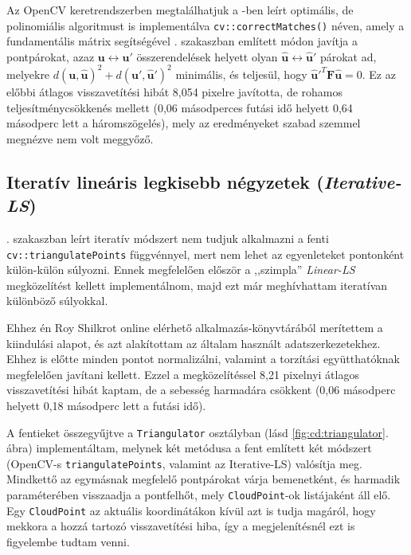 Az OpenCV keretrendszerben megtalálhatjuk a \cite{hartley-triangulation}-ben leírt optimális, de polinomiális algoritmust is implementálva \texttt{cv::correctMatches()} néven, amely a fundamentális mátrix segítségével . szakaszban említett módon javítja a pontpárokat, azaz $\mathbf{u} \leftrightarrow \mathbf{u}'$ összerendelések helyett olyan $\mathbf{\hat{u}} \leftrightarrow \mathbf{\hat{u}}'$ párokat ad, melyekre $d(\mathbf{u}, \mathbf{\hat{u}})^2 + d(\mathbf{u}', \mathbf{\hat{u}}')^2$ minimális, és teljesül, hogy $\mathbf{\hat{u}}'^T \mathbf{F} \mathbf{\hat{u}} = 0$. Ez az előbbi átlagos visszavetítési hibát 8,054 pixelre javította, de rohamos teljesítménycsökkenés mellett (0,06 másodperces futási idő helyett 0,64 másodperc lett a háromszögelés), mely az eredményeket szabad szemmel megnézve nem volt meggyőző.


\subsection{Iteratív lineáris legkisebb négyzetek (\textit{Iterative-LS})}

. szakaszban leírt iteratív módszert nem tudjuk alkalmazni a fenti \texttt{cv::triangulatePoints} függvénnyel, mert nem lehet az egyenleteket pontonként külön-külön súlyozni. Ennek megfelelően először a ,,szimpla'' \textit{Linear-LS} megközelítést kellett implementálnom, majd ezt már meghívhattam iteratívan különböző súlyokkal.

Ehhez én Roy Shilkrot online elérhető alkalmazás-könyvtárából \cite{sfm-toy-library} merítettem a kiindulási alapot, és azt alakítottam az általam használt adatszerkezetekhez. Ehhez is előtte minden pontot normalizálni, valamint a torzítási együtthatóknak megfelelően javítani kellett. Ezzel a megközelítéssel 8,21 pixelnyi átlagos visszavetítési hibát kaptam, de a sebesség harmadára csökkent (0,06 másodperc helyett 0,18 másodperc lett a futási idő). %

A fentieket összegyűjtve a \texttt{Triangulator} osztályban (lásd \ref{fig:cd:triangulator}. ábra) implementáltam, melynek két metódusa a fent említett két módszert (OpenCV-s \texttt{triangulatePoints}, valamint az Iterative-LS) valósítja meg. Mindkettő az egymásnak megfelelő pontpárokat várja bemenetként, és harmadik paraméterében visszaadja a pontfelhőt, mely \texttt{CloudPoint}-ok listájaként áll elő. Egy \texttt{CloudPoint} az aktuális koordinátákon kívül azt is tudja magáról, hogy mekkora a hozzá tartozó visszavetítési hiba, így a megjelenítésnél ezt is figyelembe tudtam venni.


